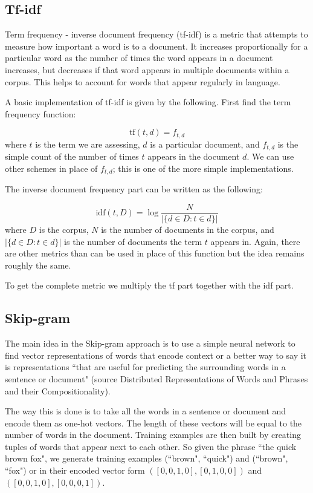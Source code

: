 \subsection{Tf-idf}

Term frequency - inverse document frequency (tf-idf) is a metric that attempts to measure how important a word is to a document. It increases proportionally for a particular word as the number of times the word appears in a document increases, but decreases if that word appears in multiple documents within a corpus. This helps to account for words that appear regularly in language. 

A basic implementation of tf-idf is given by the following. First find the term frequency function:

\begin{equation}
\text{tf}(t,d) = f_{t,d}
\end{equation}
\noindent where $t$ is the term we are assessing, $d$ is a particular document, and $f_{t,d}$ is the simple count of the number of times $t$ appears in the document $d$. We can use other schemes in place of $f_{t,d}$; this is one of the more simple implementations.

The inverse document frequency part can be written as the following:

\begin{equation}
\text{idf}(t,D) = \log{\frac{N}{|\{d \in D:t\in d \}| }}
\end{equation}
\noindent where $D$ is the corpus, $N$ is the number of documents in the corpus, and $|\{d \in D:t\in d \}|$ is the number of documents the term $t$ appears in. Again, there are other metrics than can be used in place of this function but the idea remains roughly the same. 

To get the complete metric we multiply the tf part together with the idf part. 


\subsection{Skip-gram}

The main idea in the Skip-gram approach is to use a simple neural network to find vector representations of words that encode context or a better way to say it is representations ``that are useful for predicting the surrounding words in a sentence or document" (source Distributed Representations of Words and Phrases and their Compositionality). 

The way this is done is to take all the words in a sentence or document and encode them as one-hot vectors. The length of these vectors will be equal to the number of words in the document. Training examples are then built by creating tuples of words that appear next to each other. So given the phrase ``the quick brown fox", we generate training examples (``brown", ``quick") and (``brown", ``fox") or in their encoded vector form $([0,0,1,0],[0,1,0,0])$ and $([0,0,1,0],[0,0,0,1])$. 

